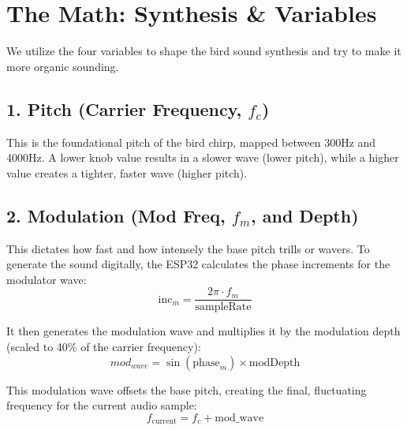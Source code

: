 \documentclass{article}
\begin{document}
\section*{The Math: Synthesis \& Variables}

We utilize the four variables to shape the bird sound synthesis and try to make it more organic sounding.

\subsection*{1. Pitch (Carrier Frequency, $f_c$)}
This is the foundational pitch of the bird chirp, mapped between 300Hz and 4000Hz. A lower knob value results in a slower wave (lower pitch), while a higher value creates a tighter, faster wave (higher pitch).

\begin{center}
\end{center}

\subsection*{2. Modulation (Mod Freq, $f_m$, and Depth)}
This dictates how fast and how intensely the base pitch trills or wavers. To generate the sound digitally, the ESP32 calculates the phase increments for the modulator wave:
$$ \text{inc}_m = \frac{2\pi \cdot f_m}{\text{sampleRate}} $$

It then generates the modulation wave and multiplies it by the modulation depth (scaled to 40\% of the carrier frequency):
$$ \text{$mod_{wave}$} = \sin(\text{phase}_m) \times \text{modDepth} $$

This modulation wave offsets the base pitch, creating the final, fluctuating frequency for the current audio sample:
$$ f_{\text{current}} = f_c + \text{mod\_wave} $$
\end{document}
